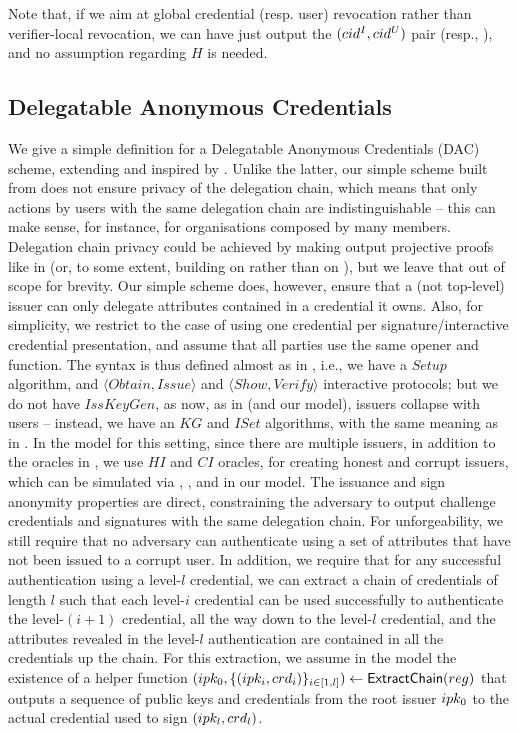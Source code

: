 Note that, if we aim at global credential (resp. user) revocation rather than
verifier-local revocation, we can have \finsp just output the $(cid^I,cid^U)$
pair (resp., \upk), and no assumption regarding $H$ is needed.

\subsection{Delegatable Anonymous Credentials}
\label{sapp:related-models-dac}

We give a simple definition for a Delegatable Anonymous Credentials (DAC)
scheme, extending \cite{fhs19} and inspired by \cite{bcc+09}. Unlike the latter,
our simple scheme built from \CUASGenInt does not ensure privacy of the
delegation chain, which means that only actions by users with the same
delegation chain are indistinguishable -- this can make sense, for instance,
for organisations composed by many members. Delegation chain privacy could be
achieved by making \feval output projective proofs like in \cite{bcc+09} (or,
to some extent, building on \CUASGenHideIss rather than on \CUASGen), but we
leave that out of scope for brevity. Our simple scheme
does, however, ensure that a (not top-level) issuer can only delegate attributes
contained in a credential it owns. Also, for simplicity, we restrict to the case
of using one credential per signature/interactive credential presentation, and
assume that all parties use the same opener and \finsp function.
%
The syntax is thus defined almost as in ,
i.e., we have a $Setup$ algorithm, and $\langle Obtain,Issue\rangle$
and $\langle Show,Verify \rangle$ interactive protocols; but we do not have
$IssKeyGen$, as now, as in \cite{bcc+09} (and our \UAS model), issuers collapse
with users -- instead, we have an $KG$ and $ISet$ algorithms, with the same
meaning as in \UAS.
%
In the model for this setting, since there are multiple issuers, in addition
to the oracles in , we use $HI$ and $CI$ oracles,
for creating honest and corrupt issuers, which can be simulated via \HUGEN,
\CUGEN, \ISET and \ICORR in our \UAS model.
%
The issuance and sign anonymity properties are direct, constraining the
adversary to output challenge credentials and signatures with the same
delegation chain. For unforgeability, we still require that no adversary can
authenticate using a set of attributes that have not been issued to a corrupt
user. In addition, we require that for any successful authentication using a
level-$l$ credential, we can extract a chain of credentials of length $l$ such
that each level-$i$ credential can be used successfully to authenticate the
level-$(i+1)$ credential, all the way down to the level-$l$ credential, and the
attributes revealed in the level-$l$ authentication are contained in all the
credentials up the chain. For this extraction, we assume in the model the
existence of a helper function $(ipk_0,\lbrace (ipk_i,crd_i)
\rbrace_{i\in[1,l]}) \gets \mathsf{ExtractChain}(reg)$ that outputs a
sequence of public keys and credentials from the root issuer $ipk_0$ to the
actual credential used to sign $(ipk_l,crd_l)$.


